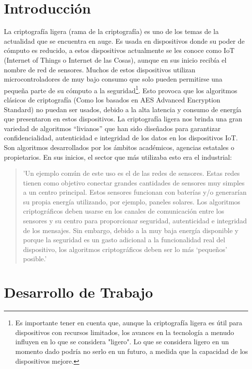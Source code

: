 \documentclass[a4paper,10pt]{article}
\begin{document}
	\section{Introducción}
	La criptografía ligera (rama de la criptografía) es uno de los temas de la actualidad que se encuentra en auge. Es usada en dispositivos donde su poder de cómputo es reducido, a estos dispositivos actualmente se les conoce como IoT (Internet of Things o Internet de las Cosas), aunque en sus inicio recibía el nombre de red de sensores. Muchos de estos dispositivos utilizan microcontroladores de muy bajo consumo que solo pueden permitirse una pequeña parte de su cómputo a la seguridad\footnote{Es importante tener en cuenta que, aunque la criptografía ligera es útil para dispositivos con recursos limitados, los avances en la tecnología a menudo influyen en lo que se considera "ligero". Lo que se considera ligero en un momento dado podría no serlo en un futuro, a medida que la capacidad de los dispositivos mejore.}. Esto provoca que los algoritmos clásicos de criptografía (Como los basados en AES Advanced Encryption Standard) no puedan ser usados, debido a la alta latencia y consumo de energía que presentaron en estos dispositivos. La criptografía ligera nos brinda una gran variedad de algoritmos “livianos” que han sido diseñados para garantizar confidencialidad, autenticidad e integridad de los datos en los dispositivos IoT. Son algoritmos desarrollados por los ámbitos académicos, agencias estatales o propietarios. En sus inicios, el sector que más utilizaba esto era el industrial:
	\begin{quote}
		'Un ejemplo común de este uso es el de las redes de sensores. Estas redes tienen como objetivo conectar grandes cantidades de sensores muy simples a un centro principal. Estos sensores funcionan con baterías y/o generarían su propia energía utilizando, por ejemplo, paneles solares. Los algoritmos criptográficos deben usarse en los canales de comunicación entre los sensores y su centro para proporcionar seguridad, autenticidad e integridad de los mensajes. Sin embargo, debido a la muy baja energía disponible y porque la seguridad es un gasto adicional a la funcionalidad real del dispositivo, los algoritmos criptográficos deben ser lo más ‘pequeños’ posible.' \parencite[1]{biryukov2017state}
	\end{quote}
	\section{Desarrollo de Trabajo}
	
\end{document}
